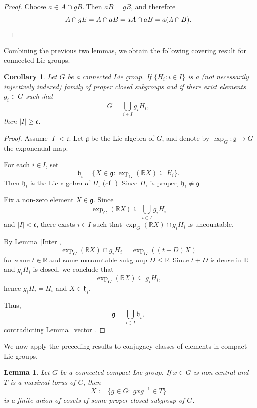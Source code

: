 \documentclass[12pt]{amsart}
\newtheorem{corollary}[theorem]{Corollary}
\newtheorem{lemma}[theorem]{Lemma}
\theoremstyle{definition}
\theoremstyle{remark}
\begin{document}
\begin{proof}
	Choose $a\in A\cap gB$.
	Then $aB=gB$, and therefore
	\[
	A\cap gB=A\cap aB=aA\cap aB=a(A\cap B).\qedhere
	\]
\end{proof}

Combining the previous two lemmas, we obtain the following covering result for connected Lie groups.
\begin{corollary}\label{Coro:coset}
	Let $G$ be a connected Lie group.
	If $\{H_i:i\in I\}$ is a (not necessarily injectively indexed) family of proper closed subgroups and if there exist elements $g_i\in G$ such that
	\[
	G=\bigcup_{i\in I}g_iH_i,
	\]
	then $|I|\ge\mathfrak{c}$.
\end{corollary}

\begin{proof}
	Assume $|I|<\mathfrak{c}$.
	Let $\mathfrak{g}$ be the Lie algebra of $G$, and denote by $\exp_G:\mathfrak{g}\to G$ the exponential map.%
	
	For each $i\in I$, set
	\[
	\mathfrak{h}_i=\{X\in\mathfrak{g}:\exp_G(\mathbb{R}X)\subseteq H_i\}.
	\]
	Then $\mathfrak{h}_i$ is the Lie algebra of $H_i$ (cf. \cite[Section 8.3]{HN}).
	Since $H_i$ is proper, $\mathfrak{h}_i\ne\mathfrak{g}$.
	
	Fix a non-zero element $X\in\mathfrak{g}$.
	Since
	\[
	\exp_G(\mathbb{R}X)\subseteq \bigcup_{i\in I}g_iH_i
	\]
	and $|I|<\mathfrak{c}$, there exists $i\in I$ such that
	$\exp_G(\mathbb{R}X)\cap g_iH_i$ is uncountable.
	
	By Lemma~\ref{Inter},
	\[
	\exp_G(\mathbb{R}X)\cap g_iH_i=\exp_G((t+D)X)
	\]
	for some $t\in\mathbb{R}$ and some uncountable subgroup $D\le\mathbb{R}$.
	Since $t+D$ is dense in $\mathbb{R}$ and $g_iH_i$ is closed, we conclude that
	\[
	\exp_G(\mathbb{R}X)\subseteq g_iH_i,
	\]
	hence $g_iH_i=H_i$ and $X\in\mathfrak{h}_i$.
	
	Thus,
	\[
	\mathfrak{g}=\bigcup_{i\in I}\mathfrak{h}_i,
	\]
	contradicting Lemma~\ref{vector}.
\end{proof}

We now apply the preceding results to conjugacy classes of elements in compact Lie groups.

\begin{lemma}\label{Le:coset}
	Let $G$ be a connected compact Lie group.
	If $x\in G$ is non-central and $T$ is a maximal torus of $G$, then
	\[
	X:=\{g\in G:\; gxg^{-1}\in T\}
	\]
	is a finite union of cosets of some proper closed subgroup of $G$.
\end{lemma}
\end{document}
